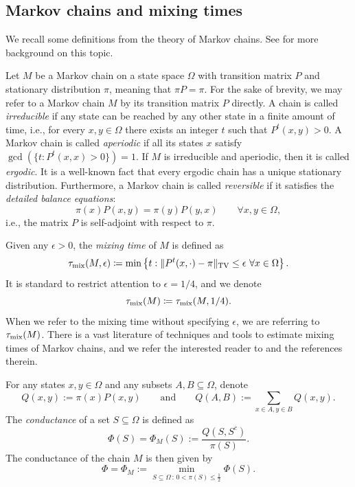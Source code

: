 \documentclass[reqno,a4paper,11pt]{amsart}
\newcommand{\Om}{\Omega}
\newcommand{\tmix}{\tau_{\rm{mix}}}
\DeclarePairedDelimiter{\norm}{\lVert}{\rVert}
\begin{document}
\subsection{Markov chains and mixing times}
We recall some definitions from the theory of Markov chains. See \cite{levin2017markov} for more background on this topic.

Let $M$ be a Markov chain on a state space $\Om$ with transition matrix $P$ and stationary distribution $\pi$, meaning that $\pi P=\pi$. For the sake of brevity, we may refer to a Markov chain $M$ by its transition matrix $P$ directly. A chain is called \textit{irreducible} if any state can be reached by any other state in a finite amount of time, i.e., for every $x,y\in \Omega$ there exists an integer $t$ such that $P^t(x,y)>0$. A Markov chain is called \textit{aperiodic} if all its states $x$ satisfy $\gcd(\{t:P^t(x,x)>0\})=1$. If $M$ is irreducible and aperiodic, then it is called \textit{ergodic}. It is a well-known fact that every ergodic chain has a unique stationary distribution. Furthermore, a Markov chain is called \textit{reversible} if it satisfies the \textit{detailed balance equations}:
\begin{equation*}
    \pi(x)P(x,y)=\pi(y)P(y,x) \qquad \forall x,y\in \Om,
\end{equation*}
i.e., the matrix $P$ is self-adjoint with respect to $\pi$.

Given any $\epsilon>0$, the \emph{mixing time} of $M$ is defined as
\[
\tau_{\rm{mix}}(M,\epsilon) \coloneqq \min\left\{t:\norm{P^t(x,\cdot)-\pi}_{\rm{TV}}\leq\epsilon \ \forall x\in\Om\right\}.
\]
It is standard to restrict attention to $\epsilon = 1/4$, and we denote
\[
\tmix(M)\coloneqq \tmix(M,1/4).
\]
When we refer to the mixing time without specifying $\epsilon$, we are referring to $\tmix(M)$. There is a vast literature of techniques and tools to estimate mixing times of Markov chains, and we refer the interested reader to \cite{levin2017markov} and the references therein.

For any states $x,y\in \Om$ and any subsets $A,B\subseteq\Om$, denote
\begin{equation*}
    Q(x,y):=\pi(x)P(x,y) \qquad \text{and} \qquad Q(A,B):=\sum_{x\in A, y\in B}Q(x,y).
\end{equation*}
The \textit{conductance} of a set $S \subseteq \Om$ is defined as
$$\Phi(S) = \Phi_M(S) :=\frac{Q(S,S^c)}{\pi(S)}.$$
The conductance of the chain $M$ is then given by
\begin{equation*}
    \Phi = \Phi_M:=\min_{S \subseteq \Om\, :\, 0<\pi(S)\leq\frac{1}{2}}\Phi(S).
\end{equation*}
\end{document}
